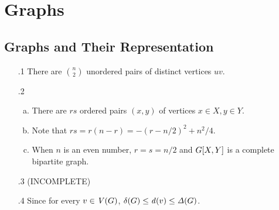 \chapter{Graphs}
\section{Graphs and Their Representation}
\begin{enumerate}[1.]
%
\item[\thesection.1] There are ${n \choose 2}$ unordered pairs of distinct vertices $uv$.
%
\item[\thesection.2]
\begin{enumerate}[a)]
\item There are $rs$ ordered pairs $(x, y)$ of vertices $x \in X, y \in Y$.
\item Note that $rs = r(n - r) = -(r - n / 2)^2 + n^2 / 4$.
\item When $n$ is an even number, $r = s = n / 2$ and $G[X, Y]$ is a complete bipartite graph.
\end{enumerate}
%
\item[\thesection.3] (INCOMPLETE)
%
\item[\thesection.4] Since for every $v \in \mathit{V}(G)$, $\mathit{\delta}(G) \leq \mathit{d}(v) \leq \mathit{\Delta}(G)$.
%
\end{enumerate}
